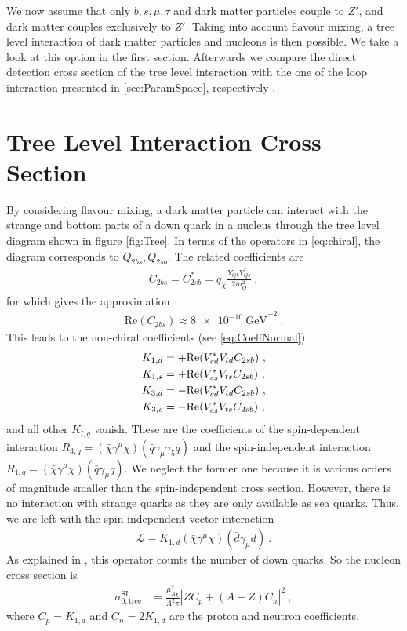 We now assume that only $b,s,\mu,\tau$ and dark matter particles couple to $Z'$, and dark matter couples exclusively to $Z'$. Taking into account flavour mixing, a tree level interaction of dark matter particles and nucleons is then possible. We take a look at this option in the first section. Afterwards we compare the direct detection cross section of the tree level interaction with the one of the loop interaction presented in \ref{sec:ParamSpace}, respectively \cite{Z}.

\section{Tree Level Interaction Cross Section}
By considering flavour mixing, a dark matter particle can interact with the strange and bottom parts of a down quark in a nucleus through the tree level diagram shown in figure \ref{fig:Tree}. In terms of the operators in \eqref{eq:chiral}, the diagram corresponds to $Q_{2bs},Q_{2sb}$. The related coefficients are
\begin{align}
	C_{2bs} = C_{2sb}^* = q_\chi\frac{Y_{Qb}Y_{Qs}^*}{2m_Q^2} \ ,
\end{align}
for which \cite{InColour} gives the approximation
\begin{align}\label{eq:BoundC}
\text{Re}\left(C_{2bs}\right) \approx \SI{8e-10}{\giga\electronvolt}^{-2} \ .
\end{align}
This leads to the non-chiral coefficients (see \eqref{eq:CoeffNormal})
\begin{align}
	K_{1,d} &= +\text{Re}(V_{cd}^*V_{td}C_{2sb}) \ , \notag \\
	K_{1,s} &= +\text{Re}(V_{cs}^*V_{ts}C_{2sb}) \ , \notag \\
	K_{3,d} &= -\text{Re}(V_{cd}^*V_{td}C_{2sb}) \ , \notag \\
	K_{3,s} &= -\text{Re}(V_{cs}^*V_{ts}C_{2sb}) \ ,
\end{align}
and all other $K_{l,q}$ vanish. These are the coefficients of the spin-dependent interaction $R_{3,q} = (\bar{\chi}\gamma^\mu\chi)(\bar{q}\gamma_\mu\gamma_5 q)$ and the spin-independent interaction $R_{1,q} = (\bar{\chi}\gamma^\mu\chi)(\bar{q}\gamma_\mu q)$. We neglect the former one because it is various orders of magnitude smaller than the spin-independent cross section. However, there is no interaction with strange quarks as they are only available as sea quarks. Thus, we are left with the spin-independent vector interaction
\begin{align}
	\mathcal{L} = K_{1,d}(\bar{\chi}\gamma^\mu\chi)(\bar{d}\gamma_\mu d) \ .
\end{align}
As explained in \cite[Chapter 7]{Supersymmetric}, this operator counts the number of down quarks. So the nucleon cross section is
\begin{align}\label{eq:Tree}
	\sigma_{0,\text{tree}}^\text{SI} &= \frac{\mu_{A\chi}^2}{A^2\pi}\left|ZC_p +(A-Z)C_n\right|^2 \ ,
\end{align}
where $C_p = K_{1,d}$ and $C_n = 2K_{1,d}$ are the proton and neutron coefficients.


